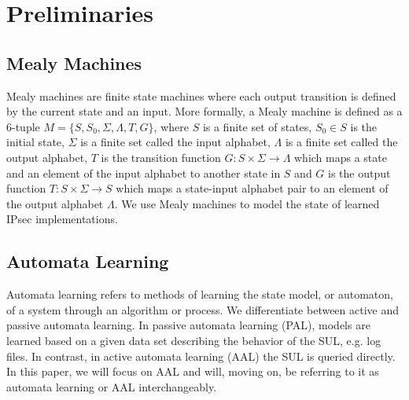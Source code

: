 %
%
% 
% 
% 

\chapter{Preliminaries}

\label{chap:Preliminaries}

\section{Mealy Machines}
Mealy machines are finite state machines where each output transition is defined by the current state and an input. More formally, a Mealy machine is defined as a 6-tuple $M = \{S, S_0, \Sigma, \Lambda, T, G\}$, where $S$ is a finite set of states, $S_0 \in S$ is the initial state, $\Sigma$ is a finite set called the input alphabet, $\Lambda$ is a finite set called the output alphabet, $T$ is the transition function $G: S \times \Sigma \rightarrow \Lambda$ which maps a state and an element of the input alphabet to another state in $S$ and $G$ is the output function $T: S \times \Sigma \rightarrow S$ which maps a state-input alphabet pair to an element of the output alphabet $\Lambda$. We use Mealy machines to model the state of learned IPsec implementations.

\section{Automata Learning}

Automata learning refers to methods of learning the state model, or automaton, of a system through an algorithm or process. We differentiate between active and passive automata learning. In passive automata learning (PAL), models are learned based on a given data set describing the behavior of the SUL, e.g. log files. In contrast, in active automata learning (AAL) the SUL is queried directly. In this paper, we will focus on AAL and will, moving on, be referring to it as automata learning or AAL interchangeably. 

